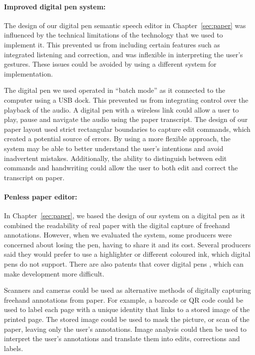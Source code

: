 \paragraph{Improved digital pen system:}

The design of our digital pen semantic speech editor in Chapter~\ref{sec:paper} was influenced by the technical
limitations of the technology that we used to implement it.  This prevented us from including certain features such as
integrated listening and correction, and was inflexible in interpreting the user's gestures.  These issues could be
avoided by using a different system for implementation.

The digital pen we used operated in ``batch mode'' as it connected to the
computer using a USB dock. This prevented us from integrating control over the playback of the audio. A digital pen
with a wireless link could allow a user to play, pause and navigate the audio using the paper transcript.  The design
of our paper layout used strict rectangular boundaries to capture edit commands, which created a potential source of
errors. By using a more flexible approach, the system may be able to better understand the user's intentions and avoid
inadvertent mistakes.  Additionally, the ability to distinguish between edit commands and handwriting could allow the
user to both edit and correct the transcript on paper.

\paragraph{Penless paper editor:}

In Chapter~\ref{sec:paper}, we based the design of our system on a digital pen as it combined the readability of real
paper with the digital capture of freehand annotations. However, when we evaluated the system, some producers were
concerned about losing the pen, having to share it and its cost. Several producers said they would prefer to use a
highlighter or different coloured ink, which digital pens do not support. There are also patents that cover digital
pens \citep{Fahraeus2003}, which can make development more difficult.

Scanners and cameras could be used as alternative methods of digitally capturing freehand annotations from paper.  For
example, a barcode or QR code could be used to label each page with a unique identity that links to a stored image of
the printed page. The stored image could be used to mask the picture, or scan of the paper, leaving only the user's
annotations. Image analysis could then be used to interpret the user's annotations and translate them into edits,
corrections and labels.

